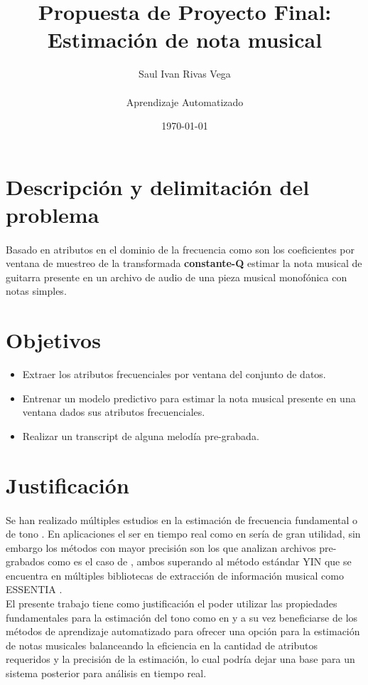 \documentclass[12pt]{article}
\title{Propuesta de Proyecto Final:\\
	Estimación de nota musical}
\author{
	Saul Ivan Rivas Vega \\
	\\
	Aprendizaje Automatizado\\
}
\date{\today}
\begin{document}
	\maketitle
	\pagebreak
	\section{Descripción y delimitación del problema}
	  \paragraph{} Basado en atributos en el dominio de la frecuencia como son los coeficientes por ventana de muestreo de la transformada \textbf{constante-Q} estimar la nota musical de guitarra presente en un archivo de audio de una pieza musical monofónica con notas simples.
	\section{Objetivos}
	\begin{itemize}
	\item Extraer los atributos frecuenciales por ventana del conjunto de datos.
	\item Entrenar un modelo predictivo para estimar la nota musical presente en una ventana dados sus atributos frecuenciales.
	\item Realizar un transcript de alguna melodía pre-grabada.
	\end{itemize}
	\section{Justificación}
	\paragraph{} Se han realizado múltiples estudios en la estimación de frecuencia fundamental o de tono \cite{das_real-time_2017,kim_crepe_2018,mauch_pyin_2014,de_cheveigne_yin_2002}. En aplicaciones el ser en tiempo real como en \cite{das_real-time_2017} sería de gran utilidad, sin embargo los métodos con mayor precisión son los que analizan archivos pre-grabados como es el caso de \cite{kim_crepe_2018,mauch_pyin_2014}, ambos superando al método estándar YIN \cite{de_cheveigne_yin_2002} que se encuentra en múltiples bibliotecas de extracción de información musical como ESSENTIA \cite{bogdanov_essentia_2013}.\\
	El presente trabajo tiene como justificación el poder utilizar las propiedades fundamentales para la estimación del tono como en \cite{de_cheveigne_yin_2002,brown_calculation_1991,brown_efficient_1992} y a su vez beneficiarse de los métodos de aprendizaje automatizado para ofrecer una opción para la estimación de notas musicales balanceando la eficiencia en la cantidad de atributos requeridos y la precisión de la estimación, lo cual podría dejar una base para un sistema posterior para análisis en tiempo real.
\end{document}

